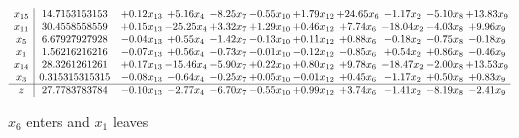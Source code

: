 \documentclass[9pt]{article}
\begin{document}
 \[\begin{array}{c| c c@{\hskip 2pt} c@{\hskip 2pt} c@{\hskip 2pt} c@{\hskip 2pt} c@{\hskip 2pt} c@{\hskip 2pt} c@{\hskip 2pt} c@{\hskip 2pt} c@{\hskip 2pt} }
 x_{15}   &  14.7153153153 & +  0.12 x_{13} & +  5.16 x_{4} & -8.25 x_{7} & -0.55 x_{10} & +  1.79 x_{12} & + 24.65 x_{6} & -1.17 x_{2} & -5.10 x_{8} & + 13.83 x_{9}\\
 x_{11}   &  30.4558558559 & +  0.15 x_{13} & -25.25 x_{4} & +  3.32 x_{7} & +  1.29 x_{10} & +  0.46 x_{12} & +  7.74 x_{6} & -18.04 x_{2} & -4.03 x_{8} & +  9.96 x_{9}\\
 x_{5}   &  6.67927927928 & -0.04 x_{13} & +  0.55 x_{4} & -1.42 x_{7} & -0.13 x_{10} & +  0.11 x_{12} & +  0.88 x_{6} & -0.18 x_{2} & -0.75 x_{8} & -0.18 x_{9}\\
 x_{1}   &  1.56216216216 & -0.07 x_{13} & +  0.56 x_{4} & -0.73 x_{7} & -0.01 x_{10} & -0.12 x_{12} & -0.85 x_{6} & +  0.54 x_{2} & +  0.86 x_{8} & -0.46 x_{9}\\
 x_{14}   &  28.3261261261 & +  0.17 x_{13} & -15.46 x_{4} & -5.90 x_{7} & +  0.22 x_{10} & +  0.80 x_{12} & +  9.78 x_{6} & -18.47 x_{2} & -2.00 x_{8} & + 13.53 x_{9}\\
 x_{3}   &  0.315315315315 & -0.08 x_{13} & -0.64 x_{4} & -0.25 x_{7} & +  0.05 x_{10} & -0.01 x_{12} & +  0.45 x_{6} & -1.17 x_{2} & +  0.50 x_{8} & +  0.83 x_{9}\\
\hline
z    &  27.7783783784 & -0.10 x_{13} & -2.77 x_{4} & -6.70 x_{7} & -0.55 x_{10} & +  0.99 x_{12} & +  3.74 x_{6} & -1.41 x_{2} & -8.19 x_{8} & -2.41 x_{9}\\
\end{array}\]


 $ x_{6} $ enters and $ x_{1} $ leaves 
\end{document}
